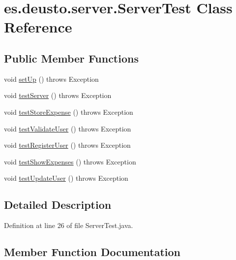 \hypertarget{classes_1_1deusto_1_1server_1_1_server_test}{}\section{es.\+deusto.\+server.\+Server\+Test Class Reference}
\label{classes_1_1deusto_1_1server_1_1_server_test}
\subsection*{Public Member Functions}
\begin{DoxyCompactItemize}
\item 
void \hyperlink{classes_1_1deusto_1_1server_1_1_server_test_af715b0b972d52aaa4d90bf086f990921}{set\+Up} ()  throws Exception 
\item 
void \hyperlink{classes_1_1deusto_1_1server_1_1_server_test_a9c697e77e1422a1d0835f6e6a38036f4}{test\+Server} ()  throws Exception 
\item 
void \hyperlink{classes_1_1deusto_1_1server_1_1_server_test_a7406203a7ff08400597008ca722f6205}{test\+Store\+Expense} ()  throws Exception 
\item 
void \hyperlink{classes_1_1deusto_1_1server_1_1_server_test_af493f29fde42af9e7d4c065f49bf8502}{test\+Validate\+User} ()  throws Exception 
\item 
void \hyperlink{classes_1_1deusto_1_1server_1_1_server_test_ab50ebca6957682f2a7e6e51dc06278cf}{test\+Register\+User} ()  throws Exception 
\item 
void \hyperlink{classes_1_1deusto_1_1server_1_1_server_test_ade86728a524037a1712106cd4741c690}{test\+Show\+Expenses} ()  throws Exception 
\item 
void \hyperlink{classes_1_1deusto_1_1server_1_1_server_test_ad64ead953df265e40d07bdc0ab11137c}{test\+Update\+User} ()  throws Exception
\end{DoxyCompactItemize}


\subsection{Detailed Description}


Definition at line 26 of file Server\+Test.\+java.



\subsection{Member Function Documentation}
\mbox{\label{classes_1_1deusto_1_1server_1_1_server_test_af715b0b972d52aaa4d90bf086f990921}} 
